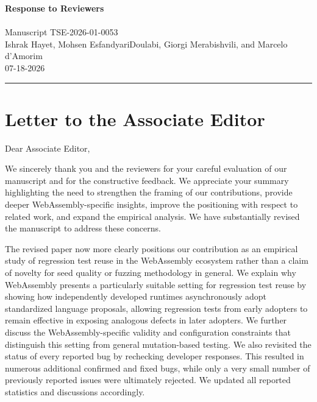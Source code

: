 \documentclass[11pt]{article}
\newcommand{\manuscriptID}{TSE-2026-01-0053}
\newcommand{\authorList}{Ishrak Hayet, Mohsen EsfandyariDoulabi, Giorgi Merabishvili, and Marcelo d'Amorim}
\newcommand{\aeName}{Associate Editor}
\begin{document}
\begin{center}
    {\LARGE\bfseries Response to Reviewers}\\[10pt]
    {\Large \PaperTitle{}}\\[8pt]
    {\large Manuscript \manuscriptID{}}\\[8pt]
    \authorList\\[6pt]
    \textsc{07-18-2026}
\end{center}

\vspace{1em}
\hrule
\vspace{1.5em}

\section*{Letter to the Associate Editor}

Dear \aeName{},

We sincerely thank you and the reviewers for your careful evaluation of our manuscript and for the constructive feedback. We appreciate your summary highlighting the need to strengthen the framing of our contributions, provide deeper WebAssembly-specific insights, improve the positioning with respect to related work, and expand the empirical analysis. We have substantially revised the manuscript to address these concerns.

The revised paper now more clearly positions our contribution as an empirical study of regression test reuse in the WebAssembly ecosystem rather than a claim of novelty for seed quality or fuzzing methodology in general. We explain why WebAssembly presents a particularly suitable setting for regression test reuse by showing how independently developed runtimes asynchronously adopt standardized language proposals, allowing regression tests from early adopters to remain effective in exposing analogous defects in later adopters. We further discuss the WebAssembly-specific validity and configuration constraints that distinguish this setting from general mutation-based testing. We also revisited the status of every reported bug by rechecking developer responses. This resulted in numerous additional confirmed and fixed bugs, while only a very small number of previously reported issues were ultimately rejected. We updated all reported statistics and discussions accordingly.
\end{document}
